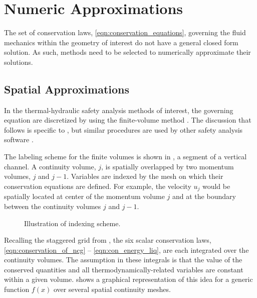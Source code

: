\section{Numeric Approximations}
\label{sect:numeric_approximation}
The set of conservation laws, \eqref{eqn:conservation_equations}, governing the fluid mechanics within the geometry of interest do not have a general closed form solution.
As such, methods need to be selected to numerically approximate their solutions.

\subsection{Spatial Approximations}
\label{subsect:spatial_approx}
In the thermal-hydraulic safety analysis methods of interest, the governing equation are discretized by using the finite-volume method \cite{LeVeque2002}.
The discussion that follows is specific to \cobra{}, but similar procedures are used by other safety analysis software \cite{RELAP,TRACE}.

The labeling scheme for the finite volumes is shown in , a segment of a vertical channel.
A continuity volume, $j$, is spatially overlapped by two momentum volumes, $j$ and $j-1$.
Variables are indexed by the mesh on which their conservation equations are defined.
For example, the velocity $u_j$ would be spatially located at center of the momentum volume $j$ and at the boundary between the continuity volumes $j$ and $j-1$.

\begin{figure}[ht]
\begin{center}
\end{center}
\caption{Illustration of indexing scheme.}
\label{fig:vertical_pipe_with_cells}
\end{figure}

Recalling the staggered grid from , the six scalar conservation laws, \eqref{eqn:conservation_of_ncg} -- \eqref{eqn:con_energy_liq}, are each integrated over the continuity volumes.
The assumption in these integrals is that the value of the conserved quantities and all thermodynamically-related variables are constant within a given volume.
 shows a graphical representation of this idea for a generic function $f(x)$ over several spatial continuity meshes.

